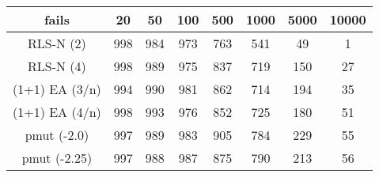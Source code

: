 \begin{tabular}[h]{cccccccc}
fails&20&50&100&500&1000&5000&10000\\\hline
RLS-N (2)&998&984&973&763&541&49&1\\
RLS-N (4)&998&989&975&837&719&150&27\\
(1+1) EA (3/n)&994&990&981&862&714&194&35\\
(1+1) EA (4/n)&998&993&976&852&725&180&51\\
pmut (-2.0)&997&989&983&905&784&229&55\\
pmut (-2.25)&997&988&987&875&790&213&56\\
\end{tabular}

